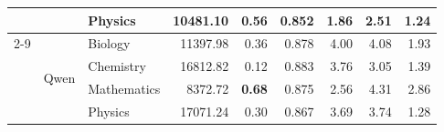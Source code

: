 \documentclass[a4paper,conference]{IEEEtran}
\begin{document}
\begin{table}[!t]
\begin{tabular}{|c|l|l|r|r|r|r|r|r|}
  &                                   & Physics     & 10481.10         & 0.56          & 0.852 & 1.86          & 2.51 & 1.24 \\ \cline{2-9}
  & \multirow{4}{*}{Qwen}            & Biology     & 11397.98         & 0.36          & 0.878 & 4.00          & 4.08 & 1.93 \\
  &                                   & Chemistry   & 16812.82         & 0.12          & 0.883 & 3.76          & 3.05 & 1.39 \\
  &                                   & Mathematics &  8372.72         & \textbf{0.68} & 0.875 & 2.56          & 4.31 & 2.86 \\
  &                                   & Physics     & 17071.24         & 0.30          & 0.867 & 3.69          & 3.74 & 1.28 \\
\hline
\end{tabular}
\normalsize
\end{table}
\end{document}
